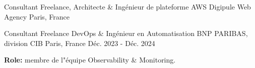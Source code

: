 
\begin{cventries}


\cventry
{Consultant Freelance, Architecte \&  Ingénieur de plateforme AWS}
{Digipule Web Agency}
{Paris, France}



\cventry
{Consultant Freelance DevOps \& Ingénieur en Automatisation} %
{BNP PARIBAS, division CIB} %
{Paris, France} %
{Déc. 2023 - Déc. 2024} %
{
  \textbf{Role:} membre de l"équipe Observability \& Monitoring.

}
\end{cventries}
